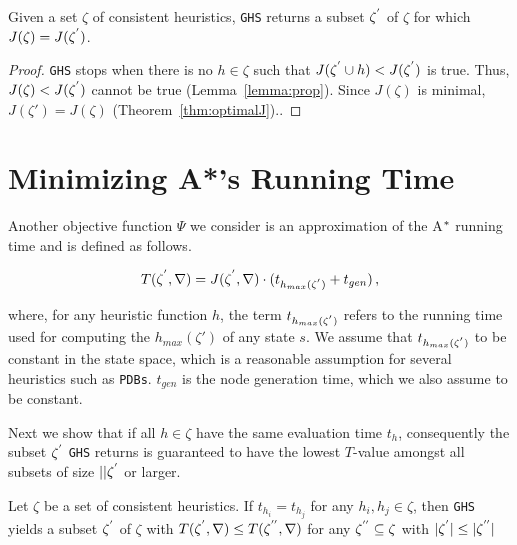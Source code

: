 \begin{theorem}
Given a set $\zeta$ of consistent heuristics, \texttt{GHS} returns a subset $\zeta\sp{'}$ of $\zeta$ for which $J(\zeta) = J(\zeta\sp{'})$. 
\label{thm:optimalJ}
\end{theorem}

\begin{proof}
 \texttt{GHS} stops when there is no $h \in \zeta$ such that $J(\zeta\sp{'} \cup h) < J(\zeta\sp{'})$ is true. Thus, $J(\zeta) < J(\zeta\sp{'})$ cannot be true (Lemma~\ref{lemma:prop}). Since $J(\zeta)$ is minimal, $J(\zeta') = J(\zeta)$  (Theorem~\ref{thm:optimalJ})..
\end{proof}
\fi

\section{Minimizing A*'s Running Time}
\noindent
Another objective function $\Psi$ we consider is an approximation of the A$\sp{*}$ running time and is defined as follows.

\begin{equation}
T(\zeta\sp{'}, \nabla) = J(\zeta\sp{'},\nabla) \cdot (t_{h_{max}(\zeta\sp{'})} + t_{gen})\,, 
\label{eq:eq_time_solving}
\end{equation}

\noindent
where, for any heuristic function $h$, the term $t_{h_{max}(\zeta\sp{'})}$ refers to the running time used for computing the $h_{max}(\zeta')$ of any state $s$. We assume that $t_{h_{max}(\zeta\sp{'})}$ to be constant in the state space, which is a reasonable assumption for several heuristics such as \texttt{PDBs}. $t_{gen}$ is the node generation time, which we also assume to be constant.

\iffalse
Next we show that if all $h \in \zeta$ have the same evaluation time $t_{h}$, consequently the subset $\zeta\sp{'}$ \texttt{GHS} returns is guaranteed to have the lowest $T$-value amongst all subsets of size $||\zeta\sp{'}$ or larger.

\begin{theorem}
Let $\zeta$ be a set of consistent heuristics. If $t_{h_{i}} = t_{h_{j}}$ for any $h_{i}, h_{j} \in \zeta$, then \texttt{GHS} yields a subset $\zeta\sp{'}$ of $\zeta$ with $T(\zeta\sp{'}, \nabla) \leq T(\zeta\sp{''}, \nabla)$ for any $\zeta\sp{''} \subseteq \zeta$ with $|\zeta\sp{'}| \leq |\zeta\sp{''}|$
\label{th:theorem_evaluation_time_heuristic}
\end{theorem} 

